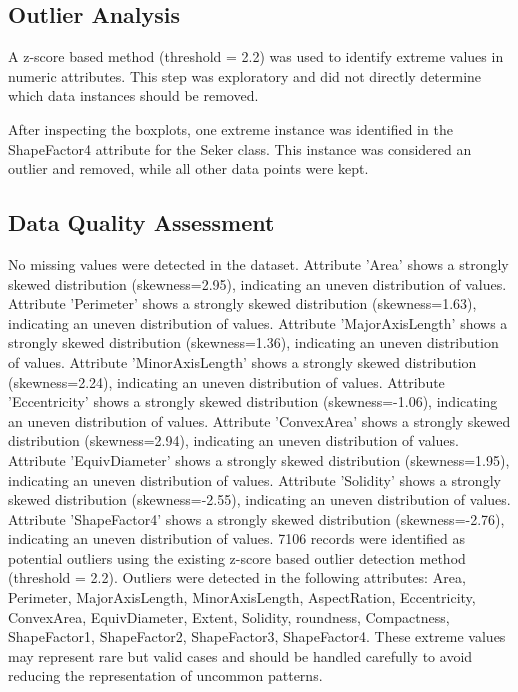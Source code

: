\documentclass[sigconf]{acmart}
\begin{document}
\subsection{Outlier Analysis}
A z-score based method (threshold = 2.2) was used to identify extreme values in numeric attributes. This step was exploratory and did not directly determine which data instances should be removed.

After inspecting the boxplots, one extreme instance was identified in the ShapeFactor4 attribute for the Seker class. This instance was considered an outlier and removed, while all other data points were kept.

\subsection{Data Quality Assessment}
No missing values were detected in the dataset. Attribute 'Area' shows a strongly skewed distribution (skewness=2.95), indicating an uneven distribution of values. Attribute 'Perimeter' shows a strongly skewed distribution (skewness=1.63), indicating an uneven distribution of values. Attribute 'MajorAxisLength' shows a strongly skewed distribution (skewness=1.36), indicating an uneven distribution of values. Attribute 'MinorAxisLength' shows a strongly skewed distribution (skewness=2.24), indicating an uneven distribution of values. Attribute 'Eccentricity' shows a strongly skewed distribution (skewness=-1.06), indicating an uneven distribution of values. Attribute 'ConvexArea' shows a strongly skewed distribution (skewness=2.94), indicating an uneven distribution of values. Attribute 'EquivDiameter' shows a strongly skewed distribution (skewness=1.95), indicating an uneven distribution of values. Attribute 'Solidity' shows a strongly skewed distribution (skewness=-2.55), indicating an uneven distribution of values. Attribute 'ShapeFactor4' shows a strongly skewed distribution (skewness=-2.76), indicating an uneven distribution of values. 7106 records were identified as potential outliers using the existing z-score based outlier detection method (threshold = 2.2). Outliers were detected in the following attributes: Area, Perimeter, MajorAxisLength, MinorAxisLength, AspectRation, Eccentricity, ConvexArea, EquivDiameter, Extent, Solidity, roundness, Compactness, ShapeFactor1, ShapeFactor2, ShapeFactor3, ShapeFactor4. These extreme values may represent rare but valid cases and should be handled carefully to avoid reducing the representation of uncommon patterns.
\end{document}
